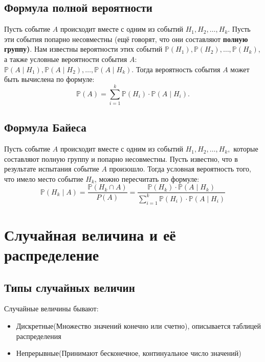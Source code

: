 \documentclass{article}
\newcommand{\PP}{\mathbb{P}}
\begin{document}
\subsection{Формула полной вероятности}
Пусть событие $A$ происходит вместе с одним из событий $H_1, H_2, \ldots, H_k.$ Пусть эти события попарно несовместны (ещё говорят, что они составляют  {\bf полную группу)}. Нам известны вероятности этих событий $\PP(H_1), \PP(H_2), \ldots, \PP(H_k)$, а также условные вероятности события $A$:  $\PP(A \mid H_1), \PP(A \mid H_2), \ldots, \PP(A \mid H_k)$. Тогда вероятность события $A$ может быть вычислена по формуле:
\[
\PP(A) = \sum_{i=1}^{k} \PP(H_i) \cdot \PP(A \mid H_i).
\]

\subsection{Формула Байеса}
Пусть событие $A$ происходит вместе с одним из событий $H_1, H_2, \ldots, H_k,$ которые составляют полную группу и попарно несовместны. Пусть известно, что в результате испытания событие $A$ произошло. Тогда условная вероятность того, что имело место событие $H_k$, можно пересчитать по формуле:
\[
\PP(H_k \mid A) = \dfrac{\PP(H_k \cap A)}{P(A)} = \dfrac{\PP(H_k) \cdot \PP(A \mid H_k)}{\sum_{i=1}^{k} \PP(H_i) \cdot \PP(A \mid H_i)}
\]

\section{Случайная величина и её распределение}

\subsection{Типы случайных величин}
Случайные величины бывают:
\begin{itemize}
  \item Дискретные(Множество значений конечно или счетно), описывается таблицей распределения
  \item Непрерывные(Принимают бесконечное, континуальное число значений)
\end{itemize}
\end{document}
